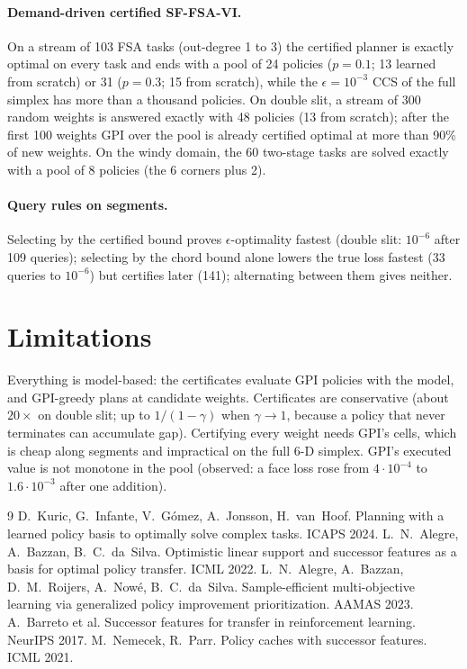 \documentclass[11pt]{article}
\begin{document}
\paragraph{Demand-driven certified SF-FSA-VI.}
On a stream of 103 FSA tasks (out-degree 1 to 3) the certified planner is exactly optimal on every task and
ends with a pool of 24 policies ($p=0.1$; 13 learned from scratch) or 31 ($p=0.3$; 15 from scratch), while the
$\epsilon=10^{-3}$ CCS of the full simplex has more than a thousand policies. On double slit, a stream of 300
random weights is answered exactly with 48 policies (13 from scratch); after the first 100 weights GPI over
the pool is already certified optimal at more than 90\% of new weights. On the windy domain, the 60 two-stage tasks
are solved exactly with a pool of 8 policies (the 6 corners plus 2).

\paragraph{Query rules on segments.} Selecting by the certified bound proves $\epsilon$-optimality fastest
(double slit: $10^{-6}$ after 109 queries); selecting by the chord bound alone lowers the true loss fastest
(33 queries to $10^{-6}$) but certifies later (141); alternating between them gives neither.

\section{Limitations}
Everything is model-based: the certificates evaluate GPI policies with the model, and GPI-greedy plans at
candidate weights. Certificates are conservative (about $20\times$ on double slit; up to $1/(1-\gamma)$ when
$\gamma\to1$, because a policy that never terminates can accumulate gap). Certifying every weight needs GPI's
cells, which is cheap along segments and impractical on the full 6-D simplex. GPI's executed value is not
monotone in the pool (observed: a face loss rose from $4\cdot10^{-4}$ to $1.6\cdot10^{-3}$ after one addition).


\begin{thebibliography}{9}
 D.~Kuric, G.~Infante, V.~G\'omez, A.~Jonsson, H.~van~Hoof. Planning with a learned policy
basis to optimally solve complex tasks. ICAPS 2024.
 L.~N.~Alegre, A.~Bazzan, B.~C.~da~Silva. Optimistic linear support and successor features
as a basis for optimal policy transfer. ICML 2022.
 L.~N.~Alegre, A.~Bazzan, D.~M.~Roijers, A.~Now\'e, B.~C.~da~Silva. Sample-efficient
multi-objective learning via generalized policy improvement prioritization. AAMAS 2023.
 A.~Barreto et al. Successor features for transfer in reinforcement learning. NeurIPS 2017.
 M.~Nemecek, R.~Parr. Policy caches with successor features. ICML 2021.
\end{thebibliography}
\end{document}
